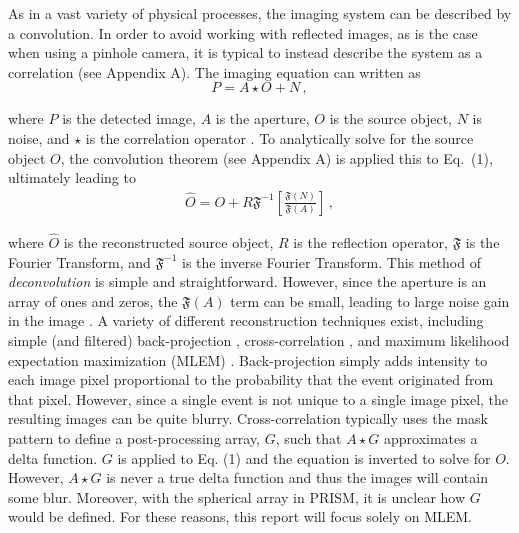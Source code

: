 \documentclass[10pt]{article}
\begin{document}
As in a vast variety of physical processes, the imaging system can be described by a convolution. In order to avoid working with reflected images, as is the case when using a pinhole camera, it is typical to instead describe the system as a correlation (see Appendix A). The imaging equation can written as
%
%
\begin{equation}
	P = A \star O + N\,,
\end{equation}

\noindent where $P$ is the detected image, $A$ is the aperture, $O$ is the source object, $N$ is noise, and $\star$ is the correlation operator \cite{FenimoreCannon1978}. To analytically solve for the source object $O$, the convolution theorem (see Appendix A) is applied this to Eq.~(1), ultimately leading to 
%
\begin{align}
	\hat{O} = O + R\mathfrak{F}^{-1}\left[ \frac{\mathfrak{F}(N)}{\mathfrak{F}(A)}\right]\,,
\end{align}

\noindent where $\hat{O}$ is the reconstructed source object, $R$ is the reflection operator, $\mathfrak{F}$ is the Fourier Transform, and $\mathfrak{F}^{-1}$ is the inverse Fourier Transform. This method of \emph{deconvolution} is simple and straightforward. However, since the aperture is an array of ones and zeros, the $\mathfrak{F}(A)$ term can be small, leading to large noise gain in the image \cite{FenimoreCannon1978}. A variety of different reconstruction techniques exist, including simple (and filtered) back-projection \cite{Wahl2011}, cross-correlation \cite{FenimoreCannon1978}, and maximum likelihood expectation maximization (MLEM) \cite{LangeCarson1984}. Back-projection simply adds intensity to each image pixel proportional to the probability that the event originated from that pixel. However, since a single event is not unique to a single image pixel, the resulting images can be quite blurry. Cross-correlation typically uses the mask pattern to define a post-processing array, $G$, such that $A\star G$ approximates a delta function. $G$ is applied to Eq. (1) and the equation is inverted to solve for $O$. However, $A\star G$ is never a true delta function and thus the images will contain some blur. Moreover, with the spherical array in PRISM, it is unclear how $G$ would be defined. For these reasons, this report will focus solely on MLEM.
\end{document}
